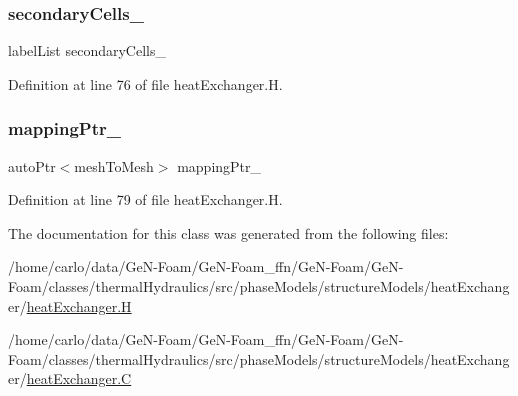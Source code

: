 \mbox{\label{classFoam_1_1heatExchanger_a9d38251d8c4019c88acb6406ca10a840}} 
\subsubsection{\texorpdfstring{secondary\+Cells\+\_\+}{secondaryCells\_}}
{\footnotesize\ttfamily label\+List secondary\+Cells\+\_\+\hspace{0.3cm}{\ttfamily [protected]}}



Definition at line 76 of file heat\+Exchanger.\+H.

\mbox{\label{classFoam_1_1heatExchanger_a123fd6cbf85f0e10cc3e6e43836eacba}} 
\subsubsection{\texorpdfstring{mapping\+Ptr\+\_\+}{mappingPtr\_}}
{\footnotesize\ttfamily auto\+Ptr$<$mesh\+To\+Mesh$>$ mapping\+Ptr\+\_\+\hspace{0.3cm}{\ttfamily [protected]}}



Definition at line 79 of file heat\+Exchanger.\+H.



The documentation for this class was generated from the following files\+:\begin{DoxyCompactItemize}
\item 
/home/carlo/data/\+Ge\+N-\/\+Foam/\+Ge\+N-\/\+Foam\+\_\+ffn/\+Ge\+N-\/\+Foam/\+Ge\+N-\/\+Foam/classes/thermal\+Hydraulics/src/phase\+Models/structure\+Models/heat\+Exchanger/\hyperlink{heatExchanger_8H}{heat\+Exchanger.\+H}\item 
/home/carlo/data/\+Ge\+N-\/\+Foam/\+Ge\+N-\/\+Foam\+\_\+ffn/\+Ge\+N-\/\+Foam/\+Ge\+N-\/\+Foam/classes/thermal\+Hydraulics/src/phase\+Models/structure\+Models/heat\+Exchanger/\hyperlink{heatExchanger_8C}{heat\+Exchanger.\+C}\end{DoxyCompactItemize}
